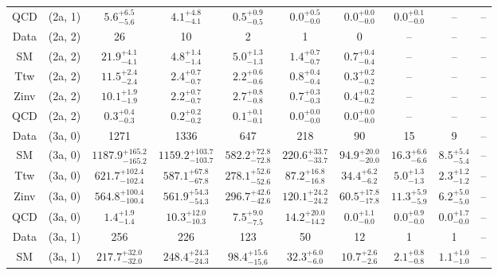 \begin{table}[h!]
{\begin{tabular}{cccccccccc}
	QCD & (2a, 1) & $5.6^{+ 6.5 }_{- 5.6 }$ & $4.1^{+ 4.8 }_{- 4.1 }$ & $0.5^{+ 0.9 }_{- 0.5 }$ & $0.0^{+ 0.5 }_{- 0.0 }$ & $0.0^{+ 0.0 }_{- 0.0 }$ & $0.0^{+ 0.1 }_{- 0.0 }$ & -- & -- \\[0.5ex] 
	Data & (2a, 2) & 26 & 10 & 2 & 1 & 0 & -- & -- & -- \\[0.5ex] 
	SM & (2a, 2) & $21.9^{+ 4.1 }_{- 4.1 }$ & $4.8^{+ 1.4 }_{- 1.4 }$ & $5.0^{+ 1.3 }_{- 1.3 }$ & $1.4^{+ 0.7 }_{- 0.7 }$ & $0.7^{+ 0.4 }_{- 0.4 }$ & -- & -- & -- \\[0.5ex] 
	Ttw & (2a, 2) & $11.5^{+ 2.4 }_{- 2.4 }$ & $2.4^{+ 0.7 }_{- 0.7 }$ & $2.2^{+ 0.6 }_{- 0.6 }$ & $0.8^{+ 0.4 }_{- 0.4 }$ & $0.3^{+ 0.2 }_{- 0.2 }$ & -- & -- & -- \\[0.5ex] 
	Zinv & (2a, 2) & $10.1^{+ 1.9 }_{- 1.9 }$ & $2.2^{+ 0.7 }_{- 0.7 }$ & $2.7^{+ 0.8 }_{- 0.8 }$ & $0.7^{+ 0.3 }_{- 0.3 }$ & $0.4^{+ 0.2 }_{- 0.2 }$ & -- & -- & -- \\[0.5ex] 
	QCD & (2a, 2) & $0.3^{+ 0.4 }_{- 0.3 }$ & $0.2^{+ 0.2 }_{- 0.2 }$ & $0.1^{+ 0.1 }_{- 0.1 }$ & $0.0^{+ 0.0 }_{- 0.0 }$ & $0.0^{+ 0.0 }_{- 0.0 }$ & -- & -- & -- \\[0.5ex] 
	Data & (3a, 0) & 1271 & 1336 & 647 & 218 & 90 & 15 & 9 & -- \\[0.5ex] 
	SM & (3a, 0) & $1187.9^{+ 165.2 }_{- 165.2 }$ & $1159.2^{+ 103.7 }_{- 103.7 }$ & $582.2^{+ 72.8 }_{- 72.8 }$ & $220.6^{+ 33.7 }_{- 33.7 }$ & $94.9^{+ 20.0 }_{- 20.0 }$ & $16.3^{+ 6.6 }_{- 6.6 }$ & $8.5^{+ 5.4 }_{- 5.4 }$ & -- \\[0.5ex] 
	Ttw & (3a, 0) & $621.7^{+ 102.4 }_{- 102.4 }$ & $587.1^{+ 67.8 }_{- 67.8 }$ & $278.1^{+ 52.6 }_{- 52.6 }$ & $87.2^{+ 16.8 }_{- 16.8 }$ & $34.4^{+ 6.2 }_{- 6.2 }$ & $5.0^{+ 1.3 }_{- 1.3 }$ & $2.3^{+ 1.2 }_{- 1.2 }$ & -- \\[0.5ex] 
	Zinv & (3a, 0) & $564.8^{+ 100.4 }_{- 100.4 }$ & $561.9^{+ 54.3 }_{- 54.3 }$ & $296.7^{+ 42.6 }_{- 42.6 }$ & $120.1^{+ 24.2 }_{- 24.2 }$ & $60.5^{+ 17.8 }_{- 17.8 }$ & $11.3^{+ 5.9 }_{- 5.9 }$ & $6.2^{+ 5.0 }_{- 5.0 }$ & -- \\[0.5ex] 
	QCD & (3a, 0) & $1.4^{+ 1.9 }_{- 1.4 }$ & $10.3^{+ 12.0 }_{- 10.3 }$ & $7.5^{+ 9.0 }_{- 7.5 }$ & $14.2^{+ 20.0 }_{- 14.2 }$ & $0.0^{+ 1.1 }_{- 0.0 }$ & $0.0^{+ 0.9 }_{- 0.0 }$ & $0.0^{+ 1.7 }_{- 0.0 }$ & -- \\[0.5ex] 
	Data & (3a, 1) & 256 & 226 & 123 & 50 & 12 & 1 & 1 & -- \\[0.5ex] 
	SM & (3a, 1) & $217.7^{+ 32.0 }_{- 32.0 }$ & $248.4^{+ 24.3 }_{- 24.3 }$ & $98.4^{+ 15.6 }_{- 15.6 }$ & $32.3^{+ 6.0 }_{- 6.0 }$ & $10.7^{+ 2.6 }_{- 2.6 }$ & $2.1^{+ 0.8 }_{- 0.8 }$ & $1.1^{+ 1.0 }_{- 1.0 }$ & -- \\[0.5ex] 

\end{tabular}}
\end{table}
